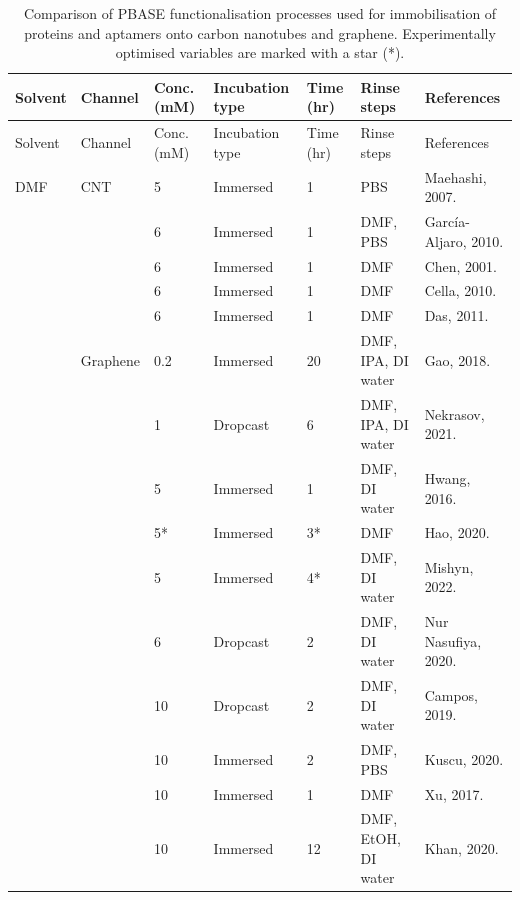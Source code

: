 \documentclass[
  a4paper,
]{scrbook}
\begin{document}
\begin{landscape}
\begin{center}

\hypertarget{tbl-pbase-functionalisation}{}
\begin{longtable}[]{@{}lllllll@{}}
\caption{\label{tbl-pbase-functionalisation}Comparison of PBASE
functionalisation processes used for immobilisation of proteins and
aptamers onto carbon nanotubes and graphene. Experimentally optimised
variables are marked with a star (*).}\tabularnewline
\toprule\noalign{}
Solvent & Channel & Conc. (mM) & Incubation type & Time (hr) & Rinse
steps & References \\
\midrule\noalign{}
\endfirsthead
\toprule\noalign{}
Solvent & Channel & Conc. (mM) & Incubation type & Time (hr) & Rinse
steps & References \\
\midrule\noalign{}
\endhead
\bottomrule\noalign{}
\endlastfoot
DMF & CNT & 5 & Immersed & 1 & PBS & Maehashi, 2007.
\cite{Maehashi2007} \\
& & 6 & Immersed & 1 & DMF, PBS & García-Aljaro, 2010.
\cite{Garcia-Aljaro2010} \\
& & 6 & Immersed & 1 & DMF & Chen, 2001. \cite{Chen2001} \\
& & 6 & Immersed & 1 & DMF & Cella, 2010. \cite{Cella2010} \\
& & 6 & Immersed & 1 & DMF & Das, 2011. \cite{Das2011} \\
& Graphene & 0.2 & Immersed & 20 & DMF, IPA, DI water & Gao, 2018.
\cite{Gao2018} \\
& & 1 & Dropcast & 6 & DMF, IPA, DI water & Nekrasov, 2021.
\cite{Nekrasov2021} \\
& & 5 & Immersed & 1 & DMF, DI water & Hwang, 2016. \cite{Hwang2016} \\
& & 5* & Immersed & 3* & DMF & Hao, 2020. \cite{Hao2020} \\
& & 5 & Immersed & 4* & DMF, DI water & Mishyn, 2022.
\cite{Mishyn2022} \\
& & 6 & Dropcast & 2 & DMF, DI water & Nur Nasufiya, 2020.
\cite{NurNasyifa2020} \\
& & 10 & Dropcast & 2 & DMF, DI water & Campos, 2019.
\cite{Campos2019} \\
& & 10 & Immersed & 2 & DMF, PBS & Kuscu, 2020. \cite{Kuscu2020} \\
& & 10 & Immersed & 1 & DMF & Xu, 2017. \cite{Xu2017} \\
& & 10 & Immersed & 12 & DMF, EtOH, DI water & Khan, 2020.

\end{longtable}
\end{center}
\end{landscape}
\end{document}
